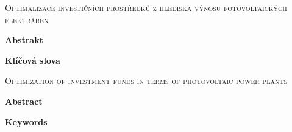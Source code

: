 \thispagestyle{empty}

\textsc{Optimalizace investičních prostředků z hlediska výnosu fotovoltaických elektráren}

\vspace{0.5cm}

\textbf{Abstrakt}

\textbf{Klíčová slova}

\vspace{0.7cm}

\textsc{Optimization of investment funds in terms of photovoltaic power plants}

\textbf{Abstract}

\textbf{Keywords}

\newpage
